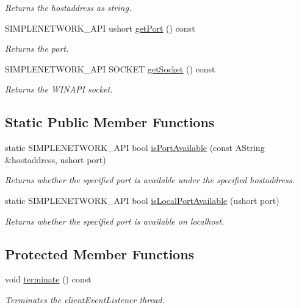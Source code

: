 \begin{DoxyCompactItemize}
\begin{DoxyCompactList}\small\item\em Returns the hostaddress as string. \end{DoxyCompactList}\item 
S\+I\+M\+P\+L\+E\+N\+E\+T\+W\+O\+R\+K\+\_\+\+A\+PI ushort \mbox{\hyperlink{class_tcp_socket_aae788fccc721be52ff85c0fcbb1424c5}{get\+Port}} () const
\begin{DoxyCompactList}\small\item\em Returns the port. \end{DoxyCompactList}\item 
S\+I\+M\+P\+L\+E\+N\+E\+T\+W\+O\+R\+K\+\_\+\+A\+PI S\+O\+C\+K\+ET \mbox{\hyperlink{class_tcp_socket_af08fd94259257c41adcc7b3722574dc6}{get\+Socket}} () const
\begin{DoxyCompactList}\small\item\em Returns the W\+I\+N\+A\+PI socket. \end{DoxyCompactList}\end{DoxyCompactItemize}
\subsection*{Static Public Member Functions}
\begin{DoxyCompactItemize}
\item 
static S\+I\+M\+P\+L\+E\+N\+E\+T\+W\+O\+R\+K\+\_\+\+A\+PI bool \mbox{\hyperlink{class_tcp_socket_a133a664281c276c9e75d961175814d7d}{is\+Port\+Available}} (const A\+String \&hostaddress, ushort port)
\begin{DoxyCompactList}\small\item\em Returns whether the specified port is available under the specified hostaddress. \end{DoxyCompactList}\item 
static S\+I\+M\+P\+L\+E\+N\+E\+T\+W\+O\+R\+K\+\_\+\+A\+PI bool \mbox{\hyperlink{class_tcp_socket_a411dcd4e6875ed636eb96cdac1ab18b9}{is\+Local\+Port\+Available}} (ushort port)
\begin{DoxyCompactList}\small\item\em Returns whether the specified port is available on localhost. \end{DoxyCompactList}\end{DoxyCompactItemize}
\subsection*{Protected Member Functions}
\begin{DoxyCompactItemize}
\item 
\mbox{\label{class_tcp_socket_a606fe5b41ef0e54fd42a45caf9966f94}} 
void \mbox{\hyperlink{class_tcp_socket_a606fe5b41ef0e54fd42a45caf9966f94}{terminate}} () const
\begin{DoxyCompactList}\small\item\em Terminates the client\+Event\+Listener thread. \end{DoxyCompactList}\end{DoxyCompactItemize}
